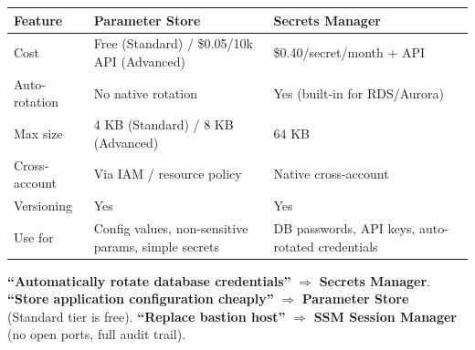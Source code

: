 \begin{comparebox}[title={Parameter Store vs Secrets Manager}]
\begin{tabular}{@{}p{3.5cm}p{4cm}p{4cm}@{}}
\toprule
\textbf{Feature} & \textbf{Parameter Store} & \textbf{Secrets Manager} \\
\midrule
Cost            & Free (Standard) / \$0.05/10k API (Advanced) & \$0.40/secret/month + API \\
Auto-rotation   & No native rotation & Yes (built-in for RDS/Aurora) \\
Max size        & 4 KB (Standard) / 8 KB (Advanced) & 64 KB \\
Cross-account   & Via IAM / resource policy & Native cross-account \\
Versioning      & Yes & Yes \\
Use for         & Config values, non-sensitive params, simple secrets & DB passwords, API keys, auto-rotated credentials \\
\bottomrule
\end{tabular}
\end{comparebox}

\begin{examtip}
\textbf{``Automatically rotate database credentials''} $\Rightarrow$ \textbf{Secrets Manager}.
\textbf{``Store application configuration cheaply''} $\Rightarrow$ \textbf{Parameter Store} (Standard tier is free).
\textbf{``Replace bastion host''} $\Rightarrow$ \textbf{SSM Session Manager} (no open ports, full audit trail).
\end{examtip}

